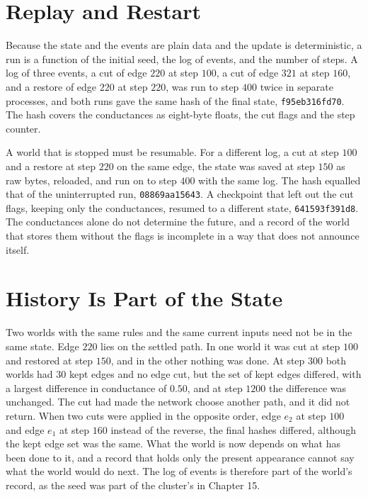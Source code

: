 \section{Replay and Restart}

Because the state and the events are plain data and the update is deterministic, a run is a function of the initial seed, the log of events, and the number of steps. A log of three events, a cut of edge $220$ at step $100$, a cut of edge $321$ at step $160$, and a restore of edge $220$ at step $220$, was run to step $400$ twice in separate processes, and both runs gave the same hash of the final state, \texttt{f95eb316fd70}. The hash covers the conductances as eight-byte floats, the cut flags and the step counter.

A world that is stopped must be resumable. For a different log, a cut at step $100$ and a restore at step $220$ on the same edge, the state was saved at step $150$ as raw bytes, reloaded, and run on to step $400$ with the same log. The hash equalled that of the uninterrupted run, \texttt{08869aa15643}. A checkpoint that left out the cut flags, keeping only the conductances, resumed to a different state, \texttt{641593f391d8}. The conductances alone do not determine the future, and a record of the world that stores them without the flags is incomplete in a way that does not announce itself.

\section{History Is Part of the State}

Two worlds with the same rules and the same current inputs need not be in the same state. Edge $220$ lies on the settled path. In one world it was cut at step $100$ and restored at step $150$, and in the other nothing was done. At step $300$ both worlds had $30$ kept edges and no edge cut, but the set of kept edges differed, with a largest difference in conductance of $0.50$, and at step $1200$ the difference was unchanged. The cut had made the network choose another path, and it did not return. When two cuts were applied in the opposite order, edge $e_2$ at step $100$ and edge $e_1$ at step $160$ instead of the reverse, the final hashes differed, although the kept edge set was the same. What the world is now depends on what has been done to it, and a record that holds only the present appearance cannot say what the world would do next. The log of events is therefore part of the world's record, as the seed was part of the cluster's in Chapter 15.

